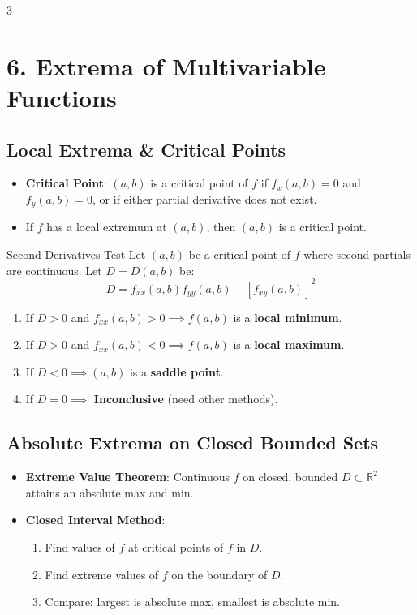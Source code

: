 \documentclass[10pt,landscape,a4paper]{article}
\begin{document}
\begin{multicols*}{3}
\section{6. Extrema of Multivariable Functions}
\subsection{Local Extrema \& Critical Points}
\begin{itemize}
    \item \textbf{Critical Point}: $(a,b)$ is a critical point of $f$ if $f_x(a,b) = 0$ and $f_y(a,b) = 0$, or if either partial derivative does not exist.
    \item If $f$ has a local extremum at $(a,b)$, then $(a,b)$ is a critical point.
\end{itemize}

\begin{theorembox}{Second Derivatives Test}
Let $(a,b)$ be a critical point of $f$ where second partials are continuous. Let $D = D(a,b)$ be:
\[ D = f_{xx}(a,b)f_{yy}(a,b) - [f_{xy}(a,b)]^2 \]
\begin{enumerate}[label=\alph*)]
    \item If $D > 0$ and $f_{xx}(a,b) > 0 \implies f(a,b)$ is a \textbf{local minimum}.
    \item If $D > 0$ and $f_{xx}(a,b) < 0 \implies f(a,b)$ is a \textbf{local maximum}.
    \item If $D < 0 \implies (a,b)$ is a \textbf{saddle point}.
    \item If $D = 0 \implies$ \textbf{Inconclusive} (need other methods).
\end{enumerate}
\end{theorembox}

\subsection{Absolute Extrema on Closed Bounded Sets}
\begin{itemize}
    \item \textbf{Extreme Value Theorem}: Continuous $f$ on closed, bounded $D \subset \mathbb{R}^2$ attains an absolute max and min.
    \item \textbf{Closed Interval Method}:
    \begin{enumerate}
        \item Find values of $f$ at critical points of $f$ in $D$.
        \item Find extreme values of $f$ on the boundary of $D$.
        \item Compare: largest is absolute max, smallest is absolute min.
    \end{enumerate}
\end{itemize}


\end{multicols*}
\end{document}
